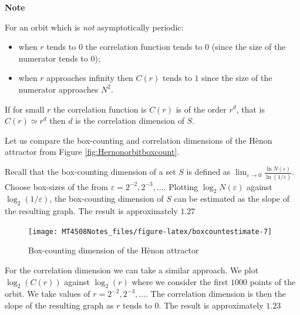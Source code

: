 \documentclass[
  a4paper,
  oneside,
  final]{krantz}
\providecommand{\tightlist}{%
  \setlength{\itemsep}{0pt}\setlength{\parskip}{0pt}}
\renewcommand{\epsilon}{\varepsilon}
\theoremstyle{definition}
\theoremstyle{definition}
\theoremstyle{definition}
\theoremstyle{definition}
\theoremstyle{remark}
\begin{document}
\begin{palegreenbox}

\begin{center}
\textbf{Note}

\end{center}

For an orbit which is \emph{not} asymptotically periodic:

\begin{itemize}
\tightlist
\item
  when \(r\) tends to \(0\) the correlation function tends to \(0\) (since the size of the numerator tends to \(0\));
\item
  when \(r\) approaches infinity then \(C(r)\) tends to \(1\) since the size of the numerator approaches \(N^2.\)
\end{itemize}

If for small \(r\) the correlation function is \(C(r)\) is of the order \(r^{d}\), that is \(C(r) \simeq r^{d}\) then \(d\) is the correlation dimension of \(S\).

\end{palegreenbox}

Let us compare the box-counting and correlation dimensions of the Hènon attractor from Figure \ref{fig:Hernonorbitboxcount}.

Recall that the box-counting dimension of a set \(S\) is defined as \(\lim_{\epsilon \to 0} \frac{\ln N(\epsilon)}{\ln(1/\epsilon)}\). Choose box-sizes of the from \(\epsilon = 2^{-2}, 2^{-3}, \ldots\). Plotting \(\log_{2} N(\epsilon)\) against \(\log_{2}(1/\epsilon)\), the box-counting dimension of \(S\) can be estimated as the slope of the resulting graph. The result is approximately \(1.27\)

\begin{figure}

{\centering \texttt{[image: MT4508Notes\_files/figure-latex/boxcountestimate-7]} 

}

\caption{Box-counting dimension of the Hènon attractor}\label{fig:boxcountestimate}
\end{figure}

For the correlation dimension we can take a similar approach. We plot \(\log_{2}(C(r))\) against \(\log_2(r)\) where we consider the first \(1000\) points of the orbit. We take values of \(r = 2^{-2}, 2^{-3}, \ldots\). The correlation dimension is then the slope of the resulting graph as \(r\) tends to \(0\). The result is approximately \(1.23\)
\end{document}
